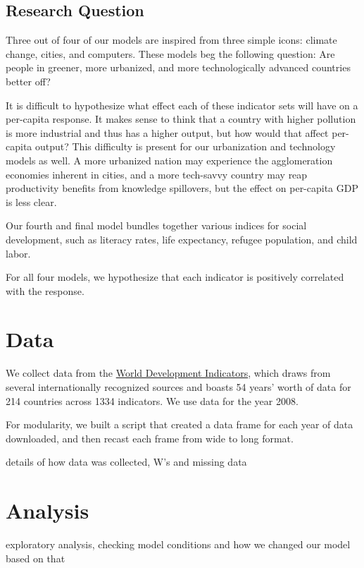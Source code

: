 \documentclass[12pt, twocolumn]{article}
\begin{document}
\subsection{\sc Research Question}
Three out of four of our models are inspired from three simple icons:
climate change, cities, and computers.
These models beg the following question:
Are people in greener, more urbanized, and more technologically advanced countries better off?

It is difficult to hypothesize what effect each of these indicator sets will have on a per-capita response.
It makes sense to think that a country with higher pollution is more industrial and thus has a higher output, 
but how would that affect per-capita output? This difficulty is present for our urbanization and technology models as well.
A more urbanized nation may experience the agglomeration economies inherent in cities, and a more
tech-savvy country may reap productivity benefits from knowledge spillovers, but the effect on per-capita GDP is less clear.

Our fourth and final model bundles together various indices for social development,
such as literacy rates, life expectancy, refugee population, and child labor.

For all four models, we hypothesize that each indicator is positively correlated with the response.




\section{\sc Data}
We collect data from the \href{http://data.worldbank.org/indicator}{World Development Indicators}, 
which draws from several internationally recognized sources and boasts 54 years' worth of data for 214 countries across 1334 indicators.
We use data for the year 2008.

For modularity, we built a script that created a data frame for each year of data downloaded, and then recast each frame from wide to long format.

details of how data was collected, W's and missing data



\section{\sc Analysis}
exploratory analysis, checking model conditions and how we changed our model based on that
\end{document}
